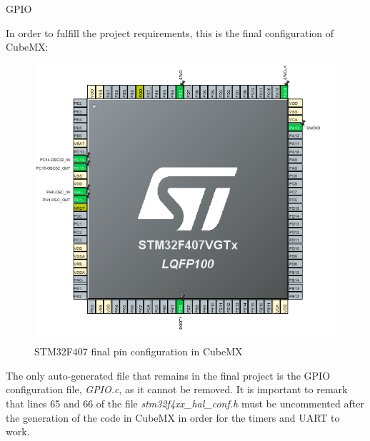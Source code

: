\documentclass[aspectratio=169]{beamer}
\begin{document}
\begin{frame}{GPIO}

In order to fulfill the project requirements, this is the final configuration of CubeMX:

\begin{figure}
    \centering
    \includegraphics[width=0.25\linewidth]{Graphics/pinout_conf_nada.png}
    \caption{STM32F407 final pin configuration in CubeMX}
    \label{fig:pin_todo}
\end{figure}

The only auto-generated file that remains in the final project is the GPIO configuration file, \textit{GPIO.c}, as it cannot be removed. It is important to remark that lines 65 and 66 of the file \textit{stm32f4xx\_hal\_conf.h} must be uncommented after the generation of the code in CubeMX in order for the timers and UART to work. 
\end{frame}
\end{document}
